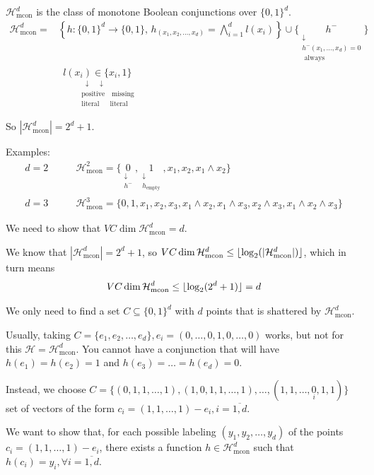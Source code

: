 \documentclass{article}
\newcommand{\<}{\langle}
\renewcommand{\>}{\rangle}
\theoremstyle{definition}
\def\gH{{\mathcal{H}}}
\newcommand{\uset}{\underset}
\newcommand{\vcd}[1]{VC \dim{#1}}
\newcommand{\szo}{\{0, 1\}}
\DeclarePairedDelimiter\floor{\lfloor}{\rfloor}
\newcommand{\uset}{\underset}
\newcommand{\usub}[2]{\underset{\substack{#1}}{#2}}
\newcommand{\hmc}{\gH_{\text{mcon}}^d}
\newcommand{\vcd}[1]{\text{VCdim}(#1)}
\newcommand{\szo}{\{0, 1\}}
\newcommand{\szod}{\{0, 1\}^d}
\newcommand{\col}{\colon}
\newcommand{\ra}{\rightarrow}
\begin{document}
$\hmc$ is the class of monotone Boolean conjunctions over $\szod$.
\begin{align*}
  \hmc =& \left\{
    h \col \szod \ra \szo,\, h_{(x_1, x_2, \dots, x_d)} =
     \bigwedge_{i=1}^d l(x_i)
  \right\}
     \cup
     \{ \usub{\downarrow \\ h^-(x_1, \dots, x_d) = 0\\ \text{ always}}{h^-} \} \\
     &
       \usub{\qquad\quad\;\downarrow\quad\downarrow\\
             \qquad\quad\text{positive}\quad{\text{missing}}\\
             \qquad\quad\text{literal}\;\;\quad\text{literal}}{l(x_i)\in \{x_i, 1\}}
\end{align*}

So $|\hmc| = 2^d + 1$.

Examples:
\begin{align*}
  d = 2 & \qquad
    \gH_{\text{mcon}}^2 =
      \{\usub{\downarrow\\h^-}{0}, \usub{\downarrow\\h_\text{empty}}{1}, x_1, x_2, x_1 \land x_2\} \\
  d = 3 & \qquad
    \gH_{\text{mcon}}^3 =
      \{0, 1, x_1, x_2, x_3, x_1 \land x_2, x_1 \land x_3, x_2 \land x_3, x_1 \land x_2 \land x_3\}
\end{align*}

We need to show that $\vcd{\hmc} = d$.

We know that $|\hmc| = 2^{d}+1$, so $\vcd{\hmc} \leq \floor{\log_2(|\hmc|)}$, which in turn means
\[\vcd{\hmc} \leq \floor{\log_2(2^{d}+1)} = d\]

We only need to find a set $C \subseteq \szod$ with $d$ points that is shattered by $\hmc$.

Usually, taking $C = \{e_1, e_2, \dots, e_d\}, e_i = (0, \dots, 0, 1, 0, \dots, 0)$ works, but
not for this $\gH = \hmc$. You cannot have a conjunction that will have
$h(e_1) = h(e_2) = 1$ and $h(e_3) = \dots = h(e_d) = 0$.

Instead, we choose $C = \{(0, 1, 1, \dots, 1), (1, 0, 1, 1, \dots, 1), \dots,
(1, 1, \dots, \uset{i}{0}, 1, 1)\}$ set of vectors of the form
${c_i = (1, 1, \dots, 1) - e_i, i = \overline{1, d}}$.

We want to show that, for each possible labeling $(y_1, y_2, \dots, y_d)$ of the points
$c_i = (1, 1, \dots, 1) - e_i$, there exists a function $h \in \hmc$ such that
$h(c_i) = y_i, \forall i = \overline{1, d}$.
\end{document}
